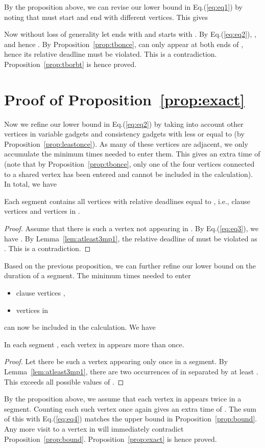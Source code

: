 \documentclass[envcountsame]{llncs}
\begin{document}
By the proposition above, we can revise our lower bound in Eq.(\ref{eq:eq1}) by noting that
 must start and end with different vertices. This gives


Now without loss of generality let  ends with  and  starts with .
By Eq.(\ref{eq:eq2}),
,
and hence .
By Proposition~\ref{prop:tbonce},  can only appear at both ends of ,
hence its relative deadline must be violated. This is a contradiction. Proposition~\ref{prop:tborbt} is hence proved.

\section{Proof of Proposition~\ref{prop:exact}}\label{app:cnt}


Now we refine our lower bound in Eq.(\ref{eq:eq2}) by taking into account other vertices in variable gadgets
and consistency gadgets with  less or equal to  (by Proposition~\ref{prop:leastonce}).
As many of these vertices are adjacent, we only accumulate the minimum times needed to enter them.
This gives an extra time of  (note that by Proposition~\ref{prop:tbonce},
only one of the four vertices connected to a shared vertex has been entered and cannot be included
in the calculation). In total, we have

 
\begin{proposition}\label{prop:32once}
Each segment  contains all vertices with relative deadlines equal to , i.e.,
clause vertices and vertices in
.
\end{proposition}
\begin{proof}
Assume that there is such a vertex  not appearing in .
By Eq.(\ref{eq:eq3}), we have .
By Lemma~\ref{lem:atleast3mp1}, the relative deadline of  must be violated as
. 
This is a contradiction.
\end{proof}

Based on the previous proposition, we can further refine our lower bound on the duration of a segment.
The minimum times needed to enter
\begin{itemize}
\item clause vertices , 
\item vertices in 
\end{itemize}
can now be included in the calculation. We have

\begin{proposition}\label{prop:pivotmoreonce}
In each segment , each vertex in  appears more than once.
\end{proposition}
\begin{proof}
Let there be such a vertex  appearing only once in a segment.
By Lemma~\ref{lem:atleast3mp1}, there are two occurrences of  in  separated by at least
.
This exceeds all possible values of .
\end{proof}

By the proposition above, we assume that each vertex in  appears twice in a segment.
Counting each such vertex once again gives an extra time of . The sum of this with Eq.(\ref{eq:eq4})
matches the upper bound in Proposition~\ref{prop:bound}.
Any more visit to a vertex in 
will immediately contradict Proposition~\ref{prop:bound}. Proposition~\ref{prop:exact} is hence proved.
\end{document}
